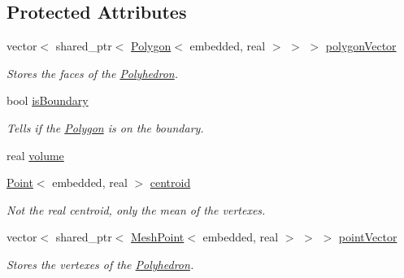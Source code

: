 \subsection*{Protected Attributes}
\begin{DoxyCompactItemize}
\item 
vector$<$ shared\+\_\+ptr$<$ \hyperlink{class_polygon}{Polygon}$<$ embedded, real $>$ $>$ $>$ \hyperlink{class_polyhedron_a5079e0df2333cd47e4aa81be382dde10}{polygon\+Vector}\hypertarget{class_polyhedron_a5079e0df2333cd47e4aa81be382dde10}{}\label{class_polyhedron_a5079e0df2333cd47e4aa81be382dde10}

\begin{DoxyCompactList}\small\item\em Stores the faces of the \hyperlink{class_polyhedron}{Polyhedron}. \end{DoxyCompactList}\item 
bool \hyperlink{class_polyhedron_a6ecb308fce1a68cb3cec39c71fe98ddd}{is\+Boundary}\hypertarget{class_polyhedron_a6ecb308fce1a68cb3cec39c71fe98ddd}{}\label{class_polyhedron_a6ecb308fce1a68cb3cec39c71fe98ddd}

\begin{DoxyCompactList}\small\item\em Tells if the \hyperlink{class_polygon}{Polygon} is on the boundary. \end{DoxyCompactList}\item 
real \hyperlink{class_polyhedron_a0f4ab3ccfdc65071201bdb0b55c2b683}{volume}
\item 
\hyperlink{class_point}{Point}$<$ embedded, real $>$ \hyperlink{class_polyhedron_ab7839d59898be24bb956fc41d1c66096}{centroid}
\begin{DoxyCompactList}\small\item\em Not the real centroid, only the mean of the vertexes. \end{DoxyCompactList}\item 
vector$<$ shared\+\_\+ptr$<$ \hyperlink{class_mesh_point}{Mesh\+Point}$<$ embedded, real $>$ $>$ $>$ \hyperlink{class_polyhedron_afda67d1ac832dd4a04539b26aa1ca3f6}{point\+Vector}\hypertarget{class_polyhedron_afda67d1ac832dd4a04539b26aa1ca3f6}{}\label{class_polyhedron_afda67d1ac832dd4a04539b26aa1ca3f6}

\begin{DoxyCompactList}\small\item\em Stores the vertexes of the \hyperlink{class_polyhedron}{Polyhedron}. \end{DoxyCompactList}\end{DoxyCompactItemize}
